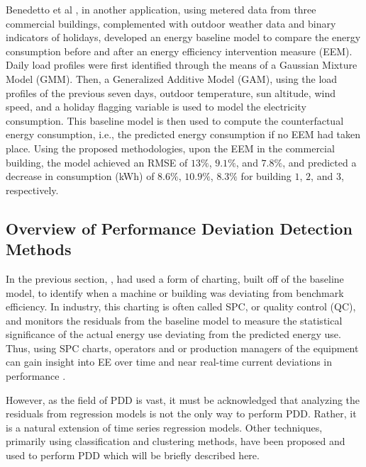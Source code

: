 Benedetto et al \cite{data-driven-MV}, in another application, using metered data from three commercial buildings, complemented with outdoor weather data and binary indicators of holidays, developed an energy baseline model to compare the energy consumption before and after an energy efficiency intervention measure (EEM). Daily load profiles were first identified through the means of a Gaussian Mixture Model (GMM). Then, a Generalized Additive Model (GAM), using the load profiles of the previous seven days, outdoor temperature, sun altitude, wind speed, and a holiday flagging variable is used to model the electricity consumption. This baseline model is then used to compute the counterfactual energy consumption, i.e., the predicted energy consumption if no EEM had taken place. Using the proposed methodologies, upon the EEM in the commercial building, the model achieved an RMSE of $13\%$, $9.1\%$, and $7.8\%$, and predicted a decrease in consumption (kWh) of $8.6\%$, $10.9\%$, $8.3\%$ for building $1$, $2$, and $3$, respectively.

\subsection{Overview of Performance Deviation Detection Methods}

In the previous section, \cite{tightening}\cite{cas}\cite{boiler}, had used a form of charting, built off of the baseline model, to identify when a machine or building was deviating from benchmark efficiency. In industry, this charting is often called SPC, or quality control (QC), and monitors the residuals from the baseline model to measure the statistical significance of the actual energy use deviating from the predicted energy use. Thus, using SPC charts, operators and or production managers of the equipment can gain insight into EE over time and near real-time current deviations in performance \cite{oakland_statistical_2008}.

However, as the field of PDD is vast, it must be acknowledged that analyzing the residuals from regression models is not the only way to perform PDD. Rather, it is a natural extension of time series regression models. Other techniques, primarily using classification and clustering methods, have been proposed and used to perform PDD which will be briefly described here.

